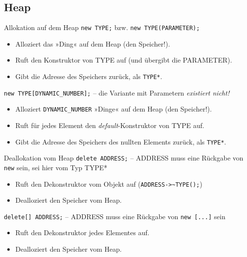 



\subsection{Heap}

\begin{frame}[fragile]{Allokation auf dem Heap}
	\verb|new TYPE;| \hspace{1em} bzw. \hspace{1em} \verb|new TYPE(PARAMETER);|
	\begin{itemize}
		\item Alloziert das »Ding« auf dem Heap (den Speicher!).
		\item Ruft den Konstruktor von TYPE auf (und übergibt die PARAMETER).
		\item Gibt die Adresse des Speichers zurück, als \verb|TYPE*|.
	\end{itemize}
	
	\vspace{2em}
	
	\verb|new TYPE[DYNAMIC_NUMBER];| -- die Variante mit Parametern \emph{existiert nicht!}
	\begin{itemize}
		\item Alloziert \verb|DYNAMIC_NUMBER| »Dinge« auf dem Heap (den Speicher!).
		\item Ruft für jedes Element den \emph{default}-Konstruktor von TYPE auf.
		\item Gibt die Adresse des Speichers des nullten Elements zurück, als \verb|TYPE*|.
	\end{itemize}
\end{frame}

\begin{frame}[fragile]{Deallokation vom Heap}
	\verb|delete ADDRESS;| -- ADDRESS muss eine Rückgabe von \verb|new| sein, sei hier vom Typ TYPE*
	\begin{itemize}
		\item Ruft den Dekonstruktor vom Objekt auf (\verb|ADDRESS->~TYPE();|)
		\item Dealloziert den Speicher vom Heap.
	\end{itemize}
	
	\vspace{2em}
	
	\verb|delete[] ADDRESS;| -- ADDRESS muss eine Rückgabe von \verb|new [...]| sein
	\begin{itemize}
		\item Ruft den Dekonstruktor jedes Elementes auf.
		\item Dealloziert den Speicher vom Heap.
	\end{itemize}
\end{frame}

